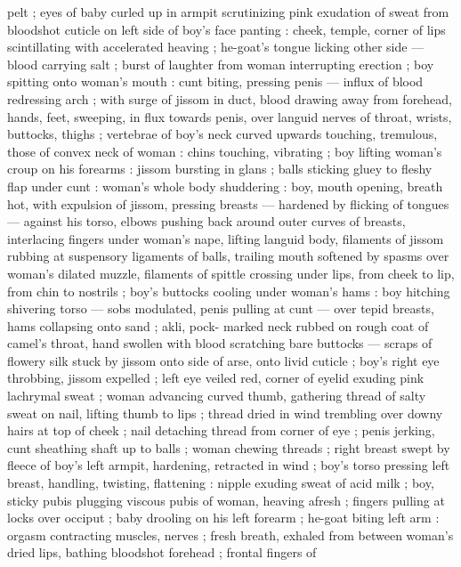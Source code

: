 pelt ; eyes of baby curled up in armpit scrutinizing pink exudation of 
sweat from bloodshot cuticle on left side of boy's face panting : 
cheek, temple, corner of lips scintillating with accelerated heaving ; 
he-goat's tongue licking other side --- blood carrying salt ; burst of 
laughter from woman interrupting erection ; boy spitting onto 
woman's mouth : cunt biting, pressing penis --- influx of blood 
redressing arch ; with surge of jissom in duct, blood drawing away 
from forehead, hands, feet, sweeping, in flux towards penis, over 
languid nerves of throat, wrists, buttocks, thighs ; vertebrae of boy's 
neck curved upwards touching, tremulous, those of convex neck of 
woman : chins touching, vibrating ; boy lifting woman's croup on his 
forearms : jissom bursting in glans ; balls sticking gluey to fleshy flap 
under cunt : woman's whole body shuddering : boy, mouth opening, 
breath hot, with expulsion of jissom, pressing breasts --- hardened 
by flicking of tongues --- against his torso, elbows pushing back 
around outer curves of breasts, interlacing fingers under woman's 
nape, lifting languid body, filaments of jissom rubbing at suspensory 
ligaments of balls, trailing mouth softened by spasms over woman's 
dilated muzzle, filaments of spittle crossing under lips, from cheek to 
lip, from chin to nostrils ; boy's buttocks cooling under woman's 
hams : boy hitching shivering torso --- sobs modulated, penis pulling 
at cunt --- over tepid breasts, hams collapsing onto sand ; akli, pock- 
marked neck rubbed on rough coat of camel's throat, hand swollen 
with blood scratching bare buttocks --- scraps of flowery silk stuck 
by jissom onto side of arse, onto livid cuticle ; boy's right eye 
throbbing, jissom expelled ; left eye veiled red, corner of eyelid 
exuding pink lachrymal sweat ; woman advancing curved thumb, 
gathering thread of salty sweat on nail, lifting thumb to lips ; thread 
dried in wind trembling over downy hairs at top of cheek ; nail 
detaching thread from corner of eye ; penis jerking, cunt sheathing 
shaft up to balls ; woman chewing threads ; right breast swept by 
fleece of boy's left armpit, hardening, retracted in wind ; boy's torso 
pressing left breast, handling, twisting, flattening : nipple exuding 
sweat of acid milk ; boy, sticky pubis plugging viscous pubis of 
woman, heaving afresh ; fingers pulling at locks over occiput ; baby 
drooling on his left forearm ; he-goat biting left arm : orgasm 
contracting muscles, nerves ; fresh breath, exhaled from between 
woman's dried lips, bathing bloodshot forehead ; frontal fingers of 
